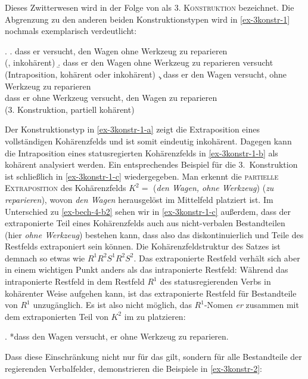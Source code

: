 Dieses Zwitterwesen wird in der Folge von \cite{denBesten:Rutten:89} als \textsc{3. Konstruktion} bezeichnet. Die Abgrenzung zu den anderen beiden Konstruktionstypen wird in \ref{ex-3konstr-1} nochmals exemplarisch verdeutlicht:

\ex. \label{ex-3konstr-1}
\a. dass er versucht, den Wagen ohne Werkzeug zu reparieren	\\
(, inkohärent) \label{ex-3konstr-1-a}	
\b. dass er den Wagen ohne Werkzeug zu reparieren versucht	\\
(Intraposition, kohärent oder inkohärent) \label{ex-3konstr-1-b}
\c. dass er den Wagen versucht, ohne Werkzeug zu reparieren \\
dass er ohne Werkzeug versucht, den Wagen zu reparieren \\
(3. Konstruktion, partiell kohärent) \label{ex-3konstr-1-c}

Der Konstruktionstyp in \ref{ex-3konstr-1-a} zeigt die Extraposition eines vollständigen Kohärenzfelds und ist somit eindeutig inkohärent. Dagegen kann die Intraposition eines statusregierten Kohärenzfelds in \ref{ex-3konstr-1-b} als kohärent analysiert werden. Ein entsprechendes Beispiel für die 3.~Konstruktion ist schlie\ss lich in \ref{ex-3konstr-1-c} wiedergegeben. Man erkennt die \textsc{partielle Extraposition} des Kohärenzfelds $K^2 =$ ({\it den Wagen, ohne Werkzeug}) ({\it zu reparieren}), wovon {\it den Wagen} herausgelöst im Mittelfeld platziert ist. Im Unterschied zu \ref{ex-bech-4-b2} sehen wir in \ref{ex-3konstr-1-c} au\ss erdem, dass der extraponierte Teil eines Kohärenzfelds auch aus nicht-verbalen Bestandteilen (hier {\it ohne Werkzeug}) bestehen kann, dass also das  diskontinuierlich und Teile des Restfelds extraponiert sein können. Die Kohärenzfeldstruktur des Satzes ist demnach so etwas wie $R^1 R^2 S^1 R^2 S^2$. Das extraponierte Restfeld verhält sich aber in einem wichtigen Punkt anders als das intraponierte Restfeld: Während das intraponierte Restfeld in dem Restfeld $R^1$ des statusregierenden Verbs in kohärenter Weise aufgehen kann, ist das extraponierte Restfeld für Bestandteile von $R^1$ unzugänglich. Es ist also nicht möglich, das $R^1$-Nomen {\it er} zusammen mit dem extraponierten Teil von $K^2$ im  zu platzieren:

\ex. *dass den Wagen versucht, er ohne Werkzeug zu reparieren. 

Dass diese Einschränkung nicht nur für das  gilt, sondern für alle Bestandteile der regierenden Verbalfelder, demonstrieren die Beispiele in \ref{ex-3konstr-2}:
\largerpage%


